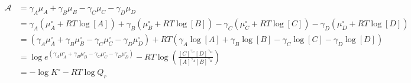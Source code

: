 \begin{eqnarray}\label{eqn:reaction-affinity-chemical-potential}
\mathcal{A} & ={{\gamma }_{A}}{{\mu }_{A}}+{{\gamma }_{B}}{{\mu }_{B}}-{{\gamma }_{C}}{{\mu }_{C}}-{{\gamma }_{D}}{{\mu }_{D}} \\
& = {{\gamma }_{A}}(\mu_A^\circ + RT\log [A])+{{\gamma }_{B}}(\mu_B^\circ + RT\log [B])-{{\gamma }_{C}}(\mu_C^\circ + RT\log [C])-{{\gamma }_{D}}(\mu_D^\circ + RT\log [D]) \\
& = (\gamma_A\mu_A^\circ + \gamma_B\mu_B^\circ -\gamma_C\mu_C^\circ -\gamma_D\mu_D^\circ) + RT\left(\gamma_A\log [A] + \gamma_B\log [B] - \gamma_C\log [C] - \gamma_D\log [D]\right) \\
& = \log e^{(\gamma_A\mu_A^\circ + \gamma_B\mu_B^\circ -\gamma_C\mu_C^\circ -\gamma_D\mu_D^\circ)} - RT\log\left( \frac{[C]^{\gamma_C}[D]^{\gamma_D}}{[A]^{\gamma_A}[B]^{\gamma_B}}\right) \\
& = -\log K^\circ - RT\log Q_r \\
\end{eqnarray}